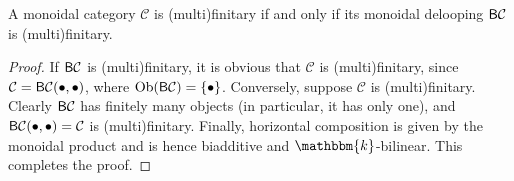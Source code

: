 
\noindent\begin{proposition} A monoidal category $\mathcal{C}$ is (multi)finitary if and only if its monoidal delooping $\textnormal{\textsf{B}}\mathcal{C}$ is (multi)finitary.\\
\end{proposition}

\noindent\begin{proof} If $\textnormal{\textsf{B}}\mathcal{C}$ is (multi)finitary, it is obvious that $\mathcal{C}$ is (multi)finitary, since $\mathcal{C} = \textnormal{\textsf{B}}\mathcal{C}(\bullet, \bullet)$, where $\textnormal{Ob}(\textnormal{\textsf{B}}\mathcal{C}) = \{\bullet\}$. Conversely, suppose $\mathcal{C}$ is (multi)finitary. Clearly $\textnormal{\textsf{B}}\mathcal{C}$ has finitely many objects (in particular, it has only one), and $\textnormal{\textsf{B}}\mathcal{C}(\bullet, \bullet) = \mathcal{C}$ is (multi)finitary. Finally, horizontal composition is given by the monoidal product and is hence biadditive and $\mathbbm{k}$-bilinear. This completes the proof.
\end{proof}\\



